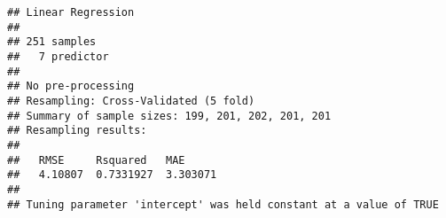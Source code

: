 \documentclass[
]{article}
\begin{document}
\begin{verbatim}
## Linear Regression 
## 
## 251 samples
##   7 predictor
## 
## No pre-processing
## Resampling: Cross-Validated (5 fold) 
## Summary of sample sizes: 199, 201, 202, 201, 201 
## Resampling results:
## 
##   RMSE     Rsquared   MAE     
##   4.10807  0.7331927  3.303071
## 
## Tuning parameter 'intercept' was held constant at a value of TRUE
\end{verbatim}
\end{document}
